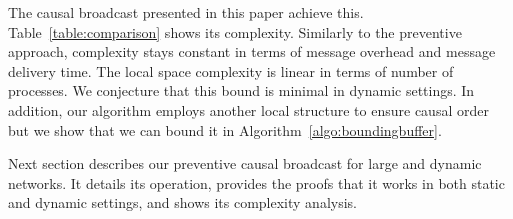 The causal broadcast presented in this paper achieve this.
Table~\ref{table:comparison} shows its complexity. Similarly to the preventive
approach, complexity stays constant in terms of message overhead and message
delivery time. The local space complexity is linear in terms of number of
processes. We conjecture that this bound is minimal in dynamic settings. In
addition, our algorithm employs another local structure to ensure causal order
but we show that we can bound it in Algorithm~\ref{algo:boundingbuffer}.

Next section describes our preventive causal broadcast for large and dynamic
networks. It details its operation, provides the proofs that it works in both
static and dynamic settings, and shows its complexity analysis.




